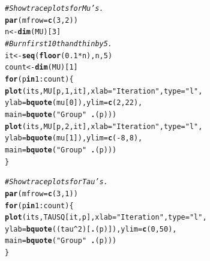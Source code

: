\documentclass[12pt,letterpaper]{article}\usepackage[]{graphicx}\usepackage[]{color}
\makeatletter
\newcommand{\hlnum}[1]{\textcolor[rgb]{0.686,0.059,0.569}{#1}}%
\newcommand{\hlstr}[1]{\textcolor[rgb]{0.192,0.494,0.8}{#1}}%
\newcommand{\hlcom}[1]{\textcolor[rgb]{0.678,0.584,0.686}{\textit{#1}}}%
\newcommand{\hlopt}[1]{\textcolor[rgb]{0,0,0}{#1}}%
\newcommand{\hlstd}[1]{\textcolor[rgb]{0.345,0.345,0.345}{#1}}%
\newcommand{\hlkwa}[1]{\textcolor[rgb]{0.161,0.373,0.58}{\textbf{#1}}}%
\newcommand{\hlkwb}[1]{\textcolor[rgb]{0.69,0.353,0.396}{#1}}%
\newcommand{\hlkwc}[1]{\textcolor[rgb]{0.333,0.667,0.333}{#1}}%
\newcommand{\hlkwd}[1]{\textcolor[rgb]{0.737,0.353,0.396}{\textbf{#1}}}%
\newenvironment{kframe}{%
 \def\at@end@of@kframe{}%
 \ifinner\ifhmode%
  \def\at@end@of@kframe{\end{minipage}}%
  \begin{minipage}{\columnwidth}%
 \fi\fi%
 \def\FrameCommand##1{\hskip\@totalleftmargin \hskip-\fboxsep
 \colorbox{shadecolor}{##1}\hskip-\fboxsep
     \hskip-\linewidth \hskip-\@totalleftmargin \hskip\columnwidth}%
 \MakeFramed {\advance\hsize-\width
   \@totalleftmargin\z@ \linewidth\hsize
   \@setminipage}}%
 {\par\unskip\endMakeFramed%
 \at@end@of@kframe}
\newenvironment{knitrout}{}{} %
\makeatother
\begin{document}
\begin{knitrout}
\begin{kframe}
\begin{alltt}
\hlcom{# Show traceplots for Mu's.}
\hlkwd{par}\hlstd{(}\hlkwc{mfrow}\hlstd{=}\hlkwd{c}\hlstd{(}\hlnum{3}\hlstd{,} \hlnum{2}\hlstd{))}
\hlstd{n} \hlkwb{<-} \hlkwd{dim}\hlstd{(MU)[}\hlnum{3}\hlstd{]}
\hlcom{# Burn first 10th and thin by 5.}
\hlstd{it} \hlkwb{<-} \hlkwd{seq}\hlstd{(}\hlkwd{floor}\hlstd{(}\hlnum{0.1}\hlopt{*}\hlstd{n), n,} \hlnum{5}\hlstd{)}
\hlstd{count} \hlkwb{<-} \hlkwd{dim}\hlstd{(MU)[}\hlnum{1}\hlstd{]}
\hlkwa{for} \hlstd{(p} \hlkwa{in} \hlnum{1}\hlopt{:}\hlstd{count) \{}
  \hlkwd{plot}\hlstd{(its, MU[p,}\hlnum{1}\hlstd{,it],} \hlkwc{xlab}\hlstd{=}\hlstr{"Iteration"}\hlstd{,} \hlkwc{type}\hlstd{=}\hlstr{"l"}\hlstd{,}
       \hlkwc{ylab}\hlstd{=}\hlkwd{bquote}\hlstd{(mu[}\hlnum{0}\hlstd{]),} \hlkwc{ylim}\hlstd{=}\hlkwd{c}\hlstd{(}\hlnum{2}\hlstd{,} \hlnum{22}\hlstd{),}
       \hlkwc{main}\hlstd{=}\hlkwd{bquote}\hlstd{(}\hlstr{"Group"}\hlopt{~}\hlkwd{.}\hlstd{(p)))}
  \hlkwd{plot}\hlstd{(its, MU[p,}\hlnum{2}\hlstd{,it],} \hlkwc{xlab}\hlstd{=}\hlstr{"Iteration"}\hlstd{,} \hlkwc{type}\hlstd{=}\hlstr{"l"}\hlstd{,}
       \hlkwc{ylab}\hlstd{=}\hlkwd{bquote}\hlstd{(mu[}\hlnum{1}\hlstd{]),} \hlkwc{ylim}\hlstd{=}\hlkwd{c}\hlstd{(}\hlopt{-}\hlnum{8}\hlstd{,}\hlnum{8}\hlstd{),}
       \hlkwc{main}\hlstd{=}\hlkwd{bquote}\hlstd{(}\hlstr{"Group"}\hlopt{~}\hlkwd{.}\hlstd{(p)))}
\hlstd{\}}

\hlcom{# Show traceplots for Tau's.}
\hlkwd{par}\hlstd{(}\hlkwc{mfrow}\hlstd{=}\hlkwd{c}\hlstd{(}\hlnum{3}\hlstd{,}\hlnum{1}\hlstd{))}
\hlkwa{for} \hlstd{(p} \hlkwa{in} \hlnum{1}\hlopt{:}\hlstd{count) \{}
  \hlkwd{plot}\hlstd{(its, TAUSQ[it,p],} \hlkwc{xlab}\hlstd{=}\hlstr{"Iteration"}\hlstd{,} \hlkwc{type}\hlstd{=}\hlstr{"l"}\hlstd{,}
       \hlkwc{ylab}\hlstd{=}\hlkwd{bquote}\hlstd{((tau}\hlopt{^}\hlnum{2}\hlstd{)[}\hlkwd{.}\hlstd{(p)]),} \hlkwc{ylim}\hlstd{=}\hlkwd{c}\hlstd{(}\hlnum{0}\hlstd{,}\hlnum{50}\hlstd{),}
       \hlkwc{main}\hlstd{=}\hlkwd{bquote}\hlstd{(}\hlstr{"Group"}\hlopt{~}\hlkwd{.}\hlstd{(p)))}
\hlstd{\}}


\end{alltt}
\end{kframe}
\end{knitrout}
\end{document}
